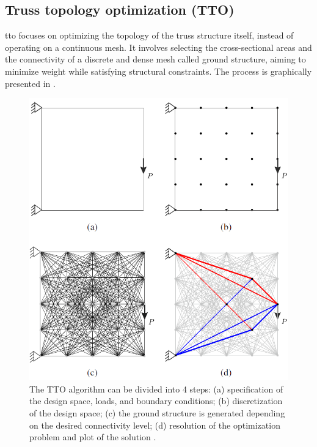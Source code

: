 \subsection{Truss topology optimization (TTO)} \label{sec:02_tto}
\acrfull{tto} focuses on optimizing the topology of the truss structure itself, instead of operating on a continuous mesh. It involves selecting the cross-sectional areas and the connectivity of a discrete and dense mesh called ground structure, aiming to minimize weight while satisfying structural constraints. The process is graphically presented in .

\begin{figure}
    \centering
    \includegraphics[width=0.7\linewidth]{figures/02_literature/layopt.png}
    \caption{The TTO algorithm can be divided into 4 steps: (a)
    specification of the design space, loads, and boundary conditions; (b) discretization
    of the design space; (c) the ground structure is generated depending on the
    desired connectivity level; (d) resolution of the optimization problem and plot of
    the solution \cite{he_python_2019}.}
    \label{fig:02_tto_ex}
\end{figure}

